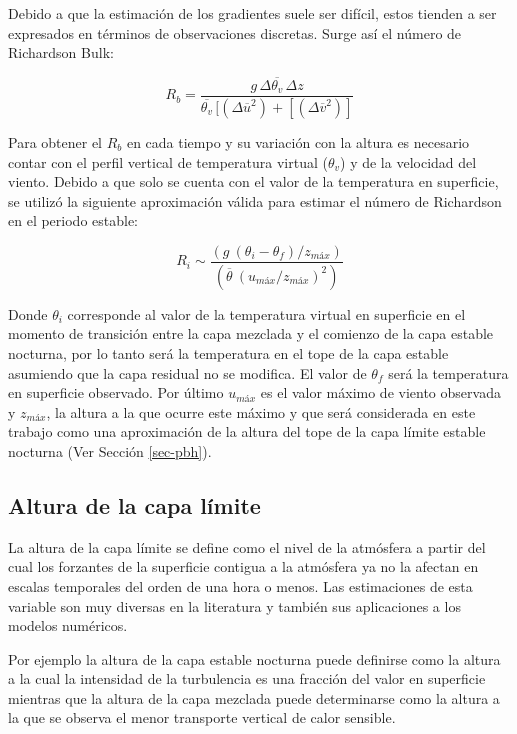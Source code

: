 \documentclass[12pt,spanish,oneside, a4paper]{book}
\begin{document}
Debido a que la estimación de los gradientes suele ser difícil, estos
tienden a ser expresados en términos de observaciones discretas. Surge
así el número de Richardson Bulk:

\begin{equation} \label{eq-ri2}
R_b = \frac{g \, \Delta \overline{\theta_v} \, \Delta z}{\overline{\theta_v} \, [(\Delta \overline{u}^2) + [(\Delta \overline{v}^2)]}
\end{equation}

Para obtener el \(R_b\) en cada tiempo y su variación con la altura es
necesario contar con el perfil vertical de temperatura virtual
(\(\theta_v\)) y de la velocidad del viento. Debido a que solo se cuenta
con el valor de la temperatura en superficie, se utilizó la siguiente
aproximación válida para estimar el número de Richardson en el periodo
estable:

\begin{equation} \label{eq-ri3}
R_i \sim \frac{(g  \: (\theta_i - \theta_f)/z_{máx})}{(\overline{\theta} \: (u_{máx}/z_{máx})^2)}
\end{equation}

Donde \(\theta_i\) corresponde al valor de la temperatura virtual en
superficie en el momento de transición entre la capa mezclada y el
comienzo de la capa estable nocturna, por lo tanto será la temperatura
en el tope de la capa estable asumiendo que la capa residual no se
modifica. El valor de \(\theta_f\) será la temperatura en superficie
observado. Por último \(u_{máx}\) es el valor máximo de viento observada
y \(z_{máx}\), la altura a la que ocurre este máximo y que será
considerada en este trabajo como una aproximación de la altura del tope
de la capa límite estable nocturna (Ver Sección \ref{sec-pbh}).

\subsection{\texorpdfstring{Altura de la capa límite
\label{sec-pbh}}{Altura de la capa límite }}\label{altura-de-la-capa-limite}

La altura de la capa límite se define como el nivel de la atmósfera a
partir del cual los forzantes de la superficie contigua a la atmósfera
ya no la afectan en escalas temporales del orden de una hora o menos.
Las estimaciones de esta variable son muy diversas en la literatura y
también sus aplicaciones a los modelos numéricos.

Por ejemplo la altura de la capa estable nocturna puede definirse como
la altura a la cual la intensidad de la turbulencia es una fracción del
valor en superficie mientras que la altura de la capa mezclada puede
determinarse como la altura a la que se observa el menor transporte
vertical de calor sensible.
\end{document}

